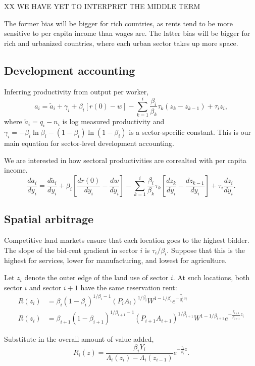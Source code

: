 \documentclass[12pt]{article}
\begin{document}
XX WE HAVE YET TO INTERPRET THE MIDDLE TERM

The former bias will be bigger for rich countries, as rents tend to be more sensitive to per capita income than wages are. The latter bias will be bigger for rich and urbanized countries, where each urban sector takes up more space.

\subsection{Development accounting}

Inferring productivity from output per worker,
\[
a_i =  \tilde a_i +\gamma_i
+\beta_i [r(0)-w]
-\sum_{k=1}^i 
\frac{\beta_i}{\beta_{k}}\tau_{k}(z_{k}-z_{k-1})
+ \tau_{i}z_{i},
\]
where $\tilde a_i = q_i-n_i$ is log measured productivity and $\gamma_i = -\beta_i\ln\beta_i-(1-\beta_i)\ln(1-\beta_i)$ is a sector-specific constant. This is our main equation for sector-level development accounting.

We are interested in how sectoral productivities are correalted with per capita income.
\[
\frac{d a_i}{dy_i} = \frac{d \tilde a_i}{dy_i} +\beta_i \left[
\frac{d r(0)}{dy_i}-\frac{d w}{dy_i}\right]
-\sum_{k=1}^i 
\frac{\beta_i}{\beta_{k}}\tau_{k}\left[\frac{d z_k}{dy_i}-\frac{d z_{k-1}}{dy_i}\right]
+ \tau_{i}\frac{d z_i}{dy_i}.
\]


\subsection{Spatial arbitrage}
Competitive land markets ensure that each location goes to the highest bidder. The slope of the bid-rent gradient in sector $i$ is $\tau_i/\beta_i$. Suppose that this is the highest for services, lower for manufacturing, and lowest for agriculture.

Let $z_i$ denote the outer edge of the land use of sector $i$. At such locations, both sector $i$ and sector $i+1$ have the same reservation rent: 
\begin{align*}
R(z_i) &=\beta_i(1-\beta_i)^{1/\beta_i-1} (P_iA_i)^{1/\beta_i} W^{1-1/\beta_i} e^{-\frac{\tau_i}{\beta_i} z_i}\\
R(z_i) &=\beta_{i+1}(1-\beta_{i+1})^{1/\beta_{i+1}-1} (P_{i+1}A_{i+1})^{1/\beta_{i+1}} W^{1-1/\beta_{i+1}} e^{-\frac{\tau_{i+1}}{\beta_{i+1}} z_i}
\end{align*}

Substitute in the overall amount of value added,
\[
R_i(z) = \frac{\beta_i Y_i}{\Lambda_i(z_i)-\Lambda_i(z_{i-1})} e^{-\frac{\tau_{i}}{\beta_{i}} z}.
\]
\end{document}
